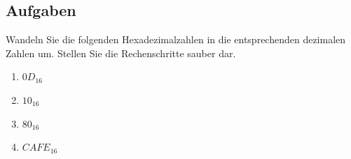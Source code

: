 \subsection{Aufgaben}
\label{subsection-hex2dez-aufgaben}

Wandeln Sie die folgenden Hexadezimalzahlen in die entsprechenden dezimalen Zahlen um. Stellen Sie die Rechenschritte sauber dar.

\begin{enumerate}
\item $0D_{16}$
\fillwithgrid{1in}
\item $10_{16}$
\fillwithgrid{1.25in}
\item $80_{16}$
\fillwithgrid{1.25in}
\item $CAFE_{16}$
\fillwithgrid{1.25in}
\end{enumerate}

